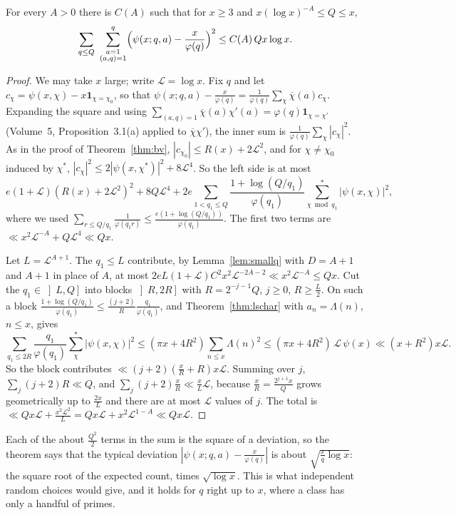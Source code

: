 \begin{theorem}\label{thm:bdh}
For every $A>0$ there is $C(A)$ such that for $x\ge3$ and $x(\log x)^{-A}\le Q\le x$,
\[
\sum_{q\le Q}\ \sum_{\substack{a=1\\(a,q)=1}}^q\Bigl(\psi(x;q,a)-\frac x{\varphi(q)}\Bigr)^2\le C(A)\,Qx\log x.
\]
\end{theorem}
\begin{proof}
We may take $x$ large; write $\mathcal L=\log x$. Fix $q$ and let $c_\chi=\psi(x,\chi)-x\mathbf 1_{\chi=\chi_0}$, so that $\psi(x;q,a)-\frac x{\varphi(q)}=\frac1{\varphi(q)}\sum_\chi\overline\chi(a)c_\chi$. Expanding the square and using $\sum_{(a,q)=1}\overline\chi(a)\chi'(a)=\varphi(q)\mathbf 1_{\chi=\chi'}$ (Volume~5, Proposition~3.1(a) applied to $\overline\chi\chi'$), the inner sum is $\frac1{\varphi(q)}\sum_\chi|c_\chi|^2$. As in the proof of Theorem~\ref{thm:bv}, $|c_{\chi_0}|\le R(x)+2\mathcal L^2$, and for $\chi\ne\chi_0$ induced by $\chi^*$, $|c_\chi|^2\le2|\psi(x,\chi^*)|^2+8\mathcal L^4$. So the left side is at most
\[
e(1+\mathcal L)(R(x)+2\mathcal L^2)^2+8Q\mathcal L^4+2e\sum_{1<q_1\le Q}\frac{1+\log(Q/q_1)}{\varphi(q_1)}\sum^*_{\chi\bmod q_1}|\psi(x,\chi)|^2,
\]
where we used $\sum_{r\le Q/q_1}\frac1{\varphi(q_1r)}\le\frac{e(1+\log(Q/q_1))}{\varphi(q_1)}$. The first two terms are $\ll x^2\mathcal L^{-A}+Q\mathcal L^4\ll Qx$.

Let $L=\mathcal L^{A+1}$. The $q_1\le L$ contribute, by Lemma~\ref{lem:smallq} with $D=A+1$ and $A+1$ in place of $A$, at most $2eL(1+\mathcal L)C^2x^2\mathcal L^{-2A-2}\ll x^2\mathcal L^{-A}\le Qx$.
Cut the $q_1\in\left]L,Q\right]$ into blocks $\left]R,2R\right]$ with $R=2^{-j-1}Q$, $j\ge0$, $R\ge\frac L2$. On such a block $\frac{1+\log(Q/q_1)}{\varphi(q_1)}\le\frac{(j+2)}R\frac{q_1}{\varphi(q_1)}$, and Theorem~\ref{thm:lschar} with $a_n=\Lambda(n)$, $n\le x$, gives
\[
\sum_{q_1\le2R}\frac{q_1}{\varphi(q_1)}\sum^*_{\chi}|\psi(x,\chi)|^2\le(\pi x+4R^2)\sum_{n\le x}\Lambda(n)^2\le(\pi x+4R^2)\,\mathcal L\,\psi(x)\ll(x+R^2)x\mathcal L.
\]
So the block contributes $\ll(j+2)(\frac xR+R)x\mathcal L$. Summing over $j$, $\sum_j(j+2)R\ll Q$, and $\sum_j(j+2)\frac xR\ll\frac xL\mathcal L$, because $\frac xR=\frac{2^{j+1}x}Q$ grows geometrically up to $\frac{2x}L$ and there are at most $\mathcal L$ values of $j$. The total is $\ll Qx\mathcal L+\frac{x^2\mathcal L^2}L=Qx\mathcal L+x^2\mathcal L^{1-A}\ll Qx\mathcal L$.
\end{proof}

Each of the about $\frac{Q^2}2$ terms in the sum is the square of a deviation, so the theorem says that the typical deviation $|\psi(x;q,a)-\frac x{\varphi(q)}|$ is about $\sqrt{\frac xq\log x}$: the square root of the expected count, times $\sqrt{\log x}$. This is what independent random choices would give, and it holds for $q$ right up to $x$, where a class has only a handful of primes.

